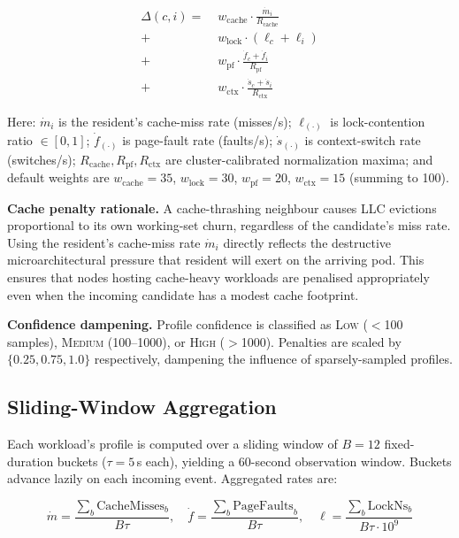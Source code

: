 \documentclass[10pt,conference,a4paper]{IEEEtran}
\begin{document}
\begin{align}
\Delta(c, i) =\; &w_{\mathrm{cache}} \cdot
    \frac{\dot{m}_i}{R_{\mathrm{cache}}} \nonumber\\
  +\; &w_{\mathrm{lock}}  \cdot (\ell_c + \ell_i) \nonumber\\
  +\; &w_{\mathrm{pf}}    \cdot
    \frac{\dot{f}_c + \dot{f}_i}{R_{\mathrm{pf}}} \nonumber\\
  +\; &w_{\mathrm{ctx}}   \cdot
    \frac{\dot{s}_c + \dot{s}_i}{R_{\mathrm{ctx}}}
\label{eq:penalty}
\end{align}

\noindent Here: $\dot{m}_{i}$ is the resident's cache-miss rate (misses/s);
$\ell_{(\cdot)}$ is lock-contention ratio $\in [0,1]$;
$\dot{f}_{(\cdot)}$ is page-fault rate (faults/s);
$\dot{s}_{(\cdot)}$ is context-switch rate (switches/s);
$R_{\mathrm{cache}}, R_{\mathrm{pf}}, R_{\mathrm{ctx}}$ are cluster-calibrated
normalization maxima; and default weights are
$w_{\mathrm{cache}}=35$, $w_{\mathrm{lock}}=30$, $w_{\mathrm{pf}}=20$,
$w_{\mathrm{ctx}}=15$ (summing to 100).

\textbf{Cache penalty rationale.} A cache-thrashing neighbour causes LLC evictions
proportional to its own working-set churn, regardless of the candidate's miss rate.
Using the resident's cache-miss rate $\dot{m}_i$ directly reflects the destructive
microarchitectural pressure that resident will exert on the arriving pod. This ensures
that nodes hosting cache-heavy workloads are penalised appropriately even when the
incoming candidate has a modest cache footprint.

\textbf{Confidence dampening.} Profile confidence is classified as \textsc{Low}
($<$100 samples), \textsc{Medium} (100--1000), or \textsc{High} ($>$1000).
Penalties are scaled by $\{0.25, 0.75, 1.0\}$ respectively, dampening the influence
of sparsely-sampled profiles.

\subsection{Sliding-Window Aggregation}
\label{sec:window}

Each workload's profile is computed over a sliding window of $B = 12$ fixed-duration
buckets ($\tau = 5$\,s each), yielding a 60-second observation window. Buckets
advance lazily on each incoming event. Aggregated rates are:

\begin{equation}
\dot{m} = \frac{\sum_b \mathrm{CacheMisses}_b}{B\tau}, \quad
\dot{f} = \frac{\sum_b \mathrm{PageFaults}_b}{B\tau}, \quad
\ell = \frac{\sum_b \mathrm{LockNs}_b}{B\tau \cdot 10^9}
\label{eq:rates}
\end{equation}
\end{document}
